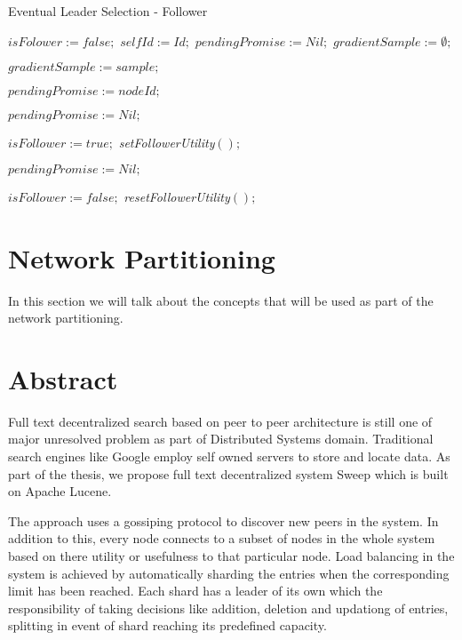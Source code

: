 \documentclass[a4paper, 11pt]{article}
\begin{document}
\begin{algorithm}[h]
\caption{Eventual Leader Selection - Follower} 
\label{follower}
\begin{algorithmic}[1]

  \State $isFolower := false;$
  \State $selfId := Id;$ $pendingPromise := Nil;$
  \State $gradientSample := \emptyset;$
\EndUponS

  \State $gradientSample := sample;$
 \EndUpon

    \State $pendingPromise := nodeId;$
    \EndTrigger
    \TriggerS[promiseTimeout]{}\EndTriggerS
  \Else
     \EndTrigger
  \EndIf
\EndUpon

\UponS[promiseTimeout]{}
  \State $pendingPromise := Nil;$
\EndUponS

    \TriggerS[followerLeaseTimeout]{}\EndTriggerS
    \TriggerS[cancelPromiseTimeout]{}\EndTriggerS
    \State $isFollower := true;$
    \State \emph{setFollowerUtility}$();$
  \EndIf
\EndUpon

\UponS[promiseTimeout]{}
  \State $pendingPromise := Nil;$
\EndUponS

\UponS[leaseTimeout]{} 
  \State $isFollower := false;$
  \State \emph{resetFollowerUtility}$();$
\EndUponS

\end{algorithmic}
\end{algorithm}



\section{Network Partitioning}
In this section we will talk about the concepts that will be used as part of the network partitioning.




\section{Abstract}
Full text decentralized search based on peer to peer architecture is still one of major unresolved problem as part of Distributed Systems domain. Traditional search engines like Google employ self owned servers to store and locate data. As part of the thesis, we propose full text decentralized system Sweep which is built on Apache Lucene.
\par The approach uses a gossiping protocol to discover new peers in the system. In addition to this, every node connects to a subset of nodes in the whole system based on there utility or usefulness to that particular node. Load balancing in the system is achieved by automatically sharding the entries when the corresponding limit has been reached. Each shard has a leader of its own which the responsibility of taking decisions like addition, deletion and updationg of entries, splitting in event of shard reaching its predefined capacity.
\end{document}
